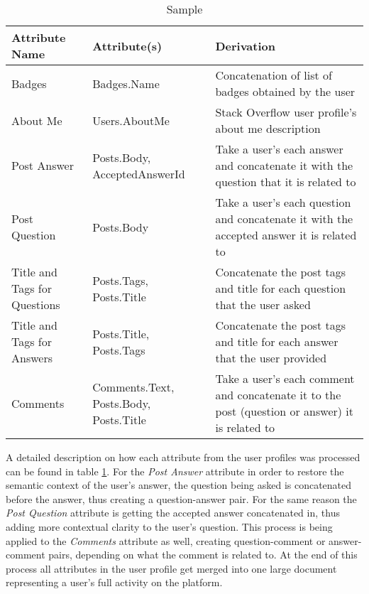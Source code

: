         \begin{table}[!htbp]
            \centering
            \label{tab:SO_userProfileExtraction}
            \caption{Sample}
            \vspace{6pt} %
            \begin{tabular}{|p{3.3cm}|p{2.7cm}|p{8cm}|}
               \toprule
               \textbf{Attribute Name} & \textbf{Attribute(s)} & \textbf{Derivation} \\
               \toprule
                Badges & Badges.Name & Concatenation of list of badges obtained by the user \\
                About Me & Users.AboutMe & Stack Overflow user profile's about me description \\
                Post Answer & Posts.Body, AcceptedAnswerId & Take a user's each answer and concatenate it with the question that it is related to  \\
                Post Question & Posts.Body & Take a user's each question and concatenate it with the accepted answer it is related to  \\
                Title and Tags for Questions & Posts.Tags, Posts.Title & Concatenate the post tags and title for each question that the user asked \\
                Title and Tags for Answers & Posts.Title, Posts.Tags & Concatenate the post tags and title for each answer that the user provided \\
                Comments & Comments.Text, Posts.Body, Posts.Title & Take a user's each comment and concatenate it to the post (question or answer) it is related to \\
               \bottomrule
            \end{tabular}
        \end{table} 
        
        A detailed description on how each attribute from the user profiles was processed can be found in table \ref{tab:SO_userProfileExtraction}. For the \textit{Post Answer} attribute in order to restore the semantic context of the user's answer, the question being asked is concatenated before the answer, thus creating a question-answer pair. For the same reason the \textit{Post Question} attribute is getting the accepted answer concatenated in, thus adding more contextual clarity to the user's question. This process is being applied to the \textit{Comments} attribute as well, creating question-comment or answer-comment pairs, depending on what the comment is related to. At the end of this process all attributes in the user profile get merged into one large document representing a user's full activity on the platform. 
        
